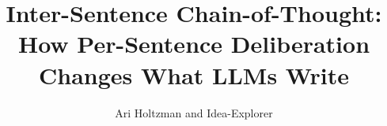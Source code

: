 \documentclass{article}
\title{Inter-Sentence Chain-of-Thought: How Per-Sentence Deliberation\\Changes What LLMs Write}
\author{Ari Holtzman and Idea-Explorer}
\begin{document}
\maketitle

\begin{abstract}

\end{abstract}










\end{document}
